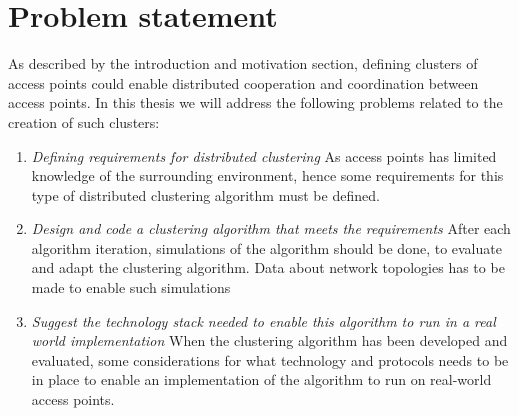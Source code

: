 \section{Problem statement}
As described by the introduction and motivation section, defining clusters of access points could enable distributed
cooperation and coordination between access points. In this thesis we will address the following problems related to the creation of such clusters:
\begin{enumerate}
	\item	\textit{Defining requirements for distributed clustering}\newline
		As access points has limited knowledge of the surrounding environment, hence some requirements 
		for this type of distributed clustering algorithm must be defined.  

	\item \textit{Design and code a clustering algorithm that meets the requirements}\newline
		After each algorithm iteration, simulations of the algorithm should be done, to evaluate and adapt the clustering algorithm.
		Data about network topologies has to be made to enable such simulations
		
	\item \textit{Suggest the technology stack needed to enable this algorithm to run in a real world implementation }\newline
		When the clustering algorithm has been developed and evaluated, some considerations for what technology and protocols needs to be in place to enable
		an implementation of the algorithm to run on real-world access points. 
\end{enumerate}

